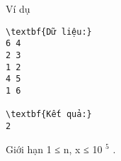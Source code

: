 Ví dụ
\begin{verbatim}
\textbf{Dữ liệu:}
6 4
2 3
1 2
4 5
1 6

\textbf{Kết quả:}
2
\end{verbatim}
Giới hạn
1 ≤ n, x ≤ 10 $^ 5 $ .